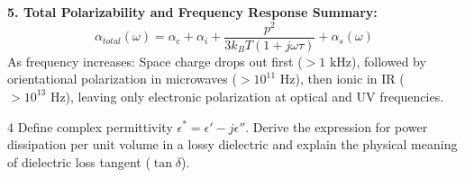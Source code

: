 \begin{theorysol}
\textbf{5. Total Polarizability and Frequency Response Summary:}
\begin{equation}
\alpha_{total}(\omega) = \alpha_e + \alpha_i + \frac{p^2}{3k_B T(1 + j\omega\tau)} + \alpha_s(\omega)
\end{equation}
As frequency increases: Space charge drops out first ($>1\text{ kHz}$), followed by orientational polarization in microwaves ($>10^{11}\text{ Hz}$), then ionic in IR ($>10^{13}\text{ Hz}$), leaving only electronic polarization at optical and UV frequencies.
\end{theorysol}
\vspace{4mm}

\begin{theoryq}{4}
Define complex permittivity $\epsilon^* = \epsilon' - j\epsilon''$. Derive the expression for power dissipation per unit volume in a lossy dielectric and explain the physical meaning of dielectric loss tangent ($\tan \delta$).
\end{theoryq}
